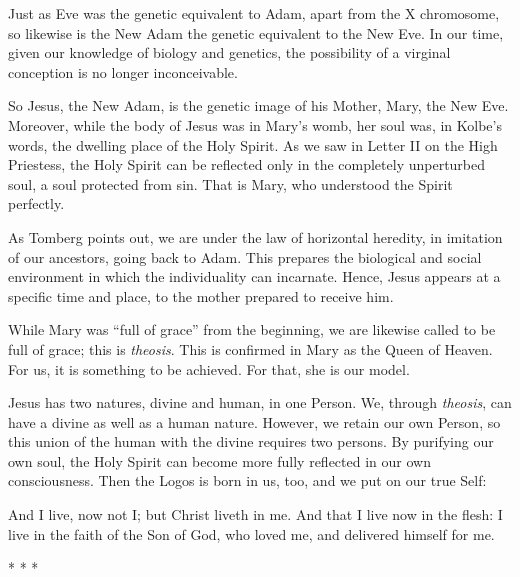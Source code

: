 Just as Eve was the genetic equivalent to Adam, apart from the X chromosome, so likewise is the New Adam the genetic
equivalent to the New Eve. In our time, given our knowledge of biology and genetics, the possibility of a virginal
conception is no longer inconceivable.

So Jesus, the New Adam, is the genetic image of his Mother, Mary, the New Eve. Moreover, while the body of Jesus was in
Mary's womb, her soul was, in Kolbe's words, the dwelling place of the Holy
Spirit. As we saw in Letter II on the High Priestess, the Holy Spirit can be reflected only in the completely
unperturbed soul, a soul protected from sin. That is Mary, who understood the Spirit perfectly.

As Tomberg points out, we are under the law of horizontal heredity, in imitation of our ancestors, going back to Adam.
This prepares the biological and social environment in which the individuality can incarnate. Hence, Jesus appears at a
specific time and place, to the mother prepared to receive him.

While Mary was “full of grace” from the beginning, we are likewise called to be full of grace; this is \emph{theosis}.
This is confirmed in Mary as the Queen of Heaven. For us, it is something to be achieved. For that, she is our model.

Jesus has two natures, divine and human, in one Person. We, through \emph{theosis}, can have a divine as well as a human
nature. However, we retain our own Person, so this union of the human with the divine requires two persons. By
purifying our own soul, the Holy Spirit can become more fully reflected in our own consciousness. Then the Logos is
born in us, too, and we put on our true Self:

\begin{quotationx}
And I live, now not I; but Christ liveth in me. And that I live now in the flesh: I live in the faith of the Son of God,
who loved me, and delivered himself for me. 
\end{quotationx}


\begin{center}* * *\end{center}

